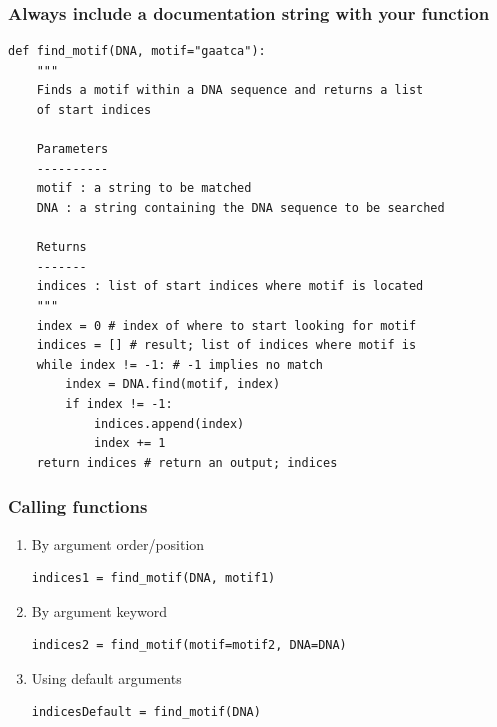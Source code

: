 \documentclass[pdf]{beamer}
\begin{document}
\begin{frame}[fragile]
\frametitle{Always include a documentation string with your function}

\begin{lstlisting}[style=python]
def find_motif(DNA, motif="gaatca"):
    """
    Finds a motif within a DNA sequence and returns a list 
    of start indices
    
    Parameters
    ----------
    motif : a string to be matched 
    DNA : a string containing the DNA sequence to be searched
    
    Returns
    -------
    indices : list of start indices where motif is located
    """
    index = 0 # index of where to start looking for motif
    indices = [] # result; list of indices where motif is
    while index != -1: # -1 implies no match
        index = DNA.find(motif, index)
        if index != -1:
            indices.append(index)
            index += 1
    return indices # return an output; indices
\end{lstlisting}

\end{frame}

\begin{frame}[fragile]
\frametitle{Calling functions}


\begin{enumerate}\addtolength{\itemsep}{-0.4\baselineskip}
\begin{lstlisting}[style=python]
# Example
motif1 = "ggatcc" # sequence to search for
motif2 = "aacctg" # another sequence to search for
DNA = "acgtgtaaccaaggatccacccgttttaaacctgtgtgggatcc"
\end{lstlisting}
\vspace{-0.5cm}
\item<1-> By argument order/position
\begin{lstlisting}[style=python]
indices1 = find_motif(DNA, motif1)
\end{lstlisting}

\item<2-> By argument keyword
\begin{lstlisting}[style=python]
indices2 = find_motif(motif=motif2, DNA=DNA)
\end{lstlisting}

\item<3-> Using default arguments
\begin{lstlisting}[style=python]
indicesDefault = find_motif(DNA)
\end{lstlisting}

\end{enumerate}

\end{frame}
\end{document}
